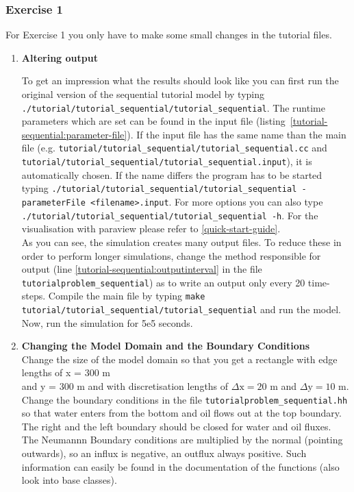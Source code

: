 \subsubsection{Exercise 1}
\renewcommand{\labelenumi}{\alph{enumi})}
For Exercise 1 you only have to make some small changes in the tutorial files.
\begin{enumerate}
\item \textbf{Altering output}

To get an impression what the results should look like you can first run the
original version of the sequential tutorial model by typing  \texttt{./tutorial/tutorial\_sequential/tutorial\_sequential}.
The runtime parameters which are set can be found in the input file (listing~\ref{tutorial-sequential:parameter-file}).
If the input file has the same name than the main file (e.g. \texttt{tutorial/tutorial\_sequential/tutorial\_sequential.cc}
and \texttt{tutorial/tutorial\_sequential/tutorial\_sequential.input}), it is automatically chosen. If the name differs
the program has to be started typing \texttt{./tutorial/tutorial\_sequential/tutorial\_sequential -parameterFile <filename>.input}.
For more options you can also type \texttt{./tutorial/tutorial\_sequential/tutorial\_sequential -h}. For the
visualisation with paraview please refer to \ref{quick-start-guide}.\\
As you can see, the simulation creates many output files. To reduce these in order
to perform longer simulations, change the method responsible for output (line
\ref{tutorial-sequential:outputinterval} in the file \texttt{tutorialproblem\_\allowbreak sequential})
as to write an output only every 20 time-steps. Compile the main file by typing
\texttt{make tutorial/tutorial\_sequential/tutorial\_sequential} and run the model. Now, run the simulation for 5e5 seconds.

\item \textbf{Changing the Model Domain and the Boundary Conditions} \\
Change the size of the model domain so that you get a rectangle
with edge lengths of x = 300 m \\  and y = 300 m and with discretisation lengths
of  $\Delta \text{x} = 20$ m and $\Delta \text{y} = 10$ m. \\
Change the boundary conditions in the file \texttt{tutorialproblem\_sequential.hh}
so that water enters from the bottom and oil flows out at the top boundary. The
right and the left boundary should be closed for water and oil fluxes. The Neumannn
Boundary conditions are multiplied by the normal (pointing outwards), so an influx
is negative, an outflux always positive. Such information can easily be found in the
documentation of the functions (also look into base classes).


\end{enumerate}
